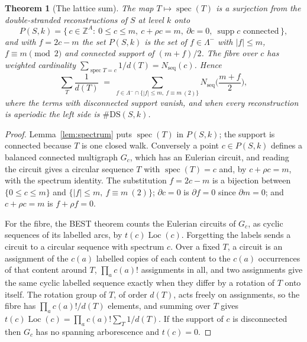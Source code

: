 \documentclass[11pt]{article}
\theoremstyle{plain}
\newtheorem{theorem}{Theorem}
\theoremstyle{definition}
\theoremstyle{remark}
\newcommand{\Z}{\mathbb{Z}}
\newcommand{\spec}{\operatorname{spec}}
\newcommand{\supp}{\operatorname{supp}}
\newcommand{\Loc}{\operatorname{Loc}}
\newcommand{\Nseq}{N_{\mathrm{seq}}}
\newcommand{\DS}{\mathrm{DS}}
\newcommand{\Lm}{\Lambda^{-}}
\begin{document}
\begin{theorem}[The lattice sum]\label{thm:lattice}
The map $T\mapsto\spec(T)$ is a surjection from the double-stranded reconstructions of $S$ at
level $k$ onto
\[
  P(S,k)=\{\,c\in\Z^A:\ 0\le c\le m,\ c+\rho c=m,\ \partial c=0,\ \supp c \text{ connected}\,\},
\]
and with $f=2c-m$ the set $P(S,k)$ is the set of $f\in\Lm$ with $|f|\le m$, $f\equiv m
\pmod 2$ and connected support of $(m+f)/2$. The fibre over $c$ has weighted cardinality
$\sum_{\spec T=c}1/d(T)=\Nseq(c)$. Hence
\[
  \sum_{T}\frac1{d(T)}\;=\;\sum_{f\in\Lm\cap\{|f|\le m,\ f\equiv m\ (2)\}}
  \Nseq\!\Big(\frac{m+f}{2}\Big),
\]
where the terms with disconnected support vanish, and when every reconstruction is aperiodic
the left side is $\#\DS(S,k)$.
\end{theorem}

\begin{proof}
Lemma~\ref{lem:spectrum} puts $\spec(T)$ in $P(S,k)$; the support is connected because $T$ is
one closed walk. Conversely a point $c\in P(S,k)$ defines a balanced connected multigraph
$G_c$, which has an Eulerian circuit, and reading the circuit gives a circular sequence $T$
with $\spec(T)=c$ and, by $c+\rho c=m$, with the spectrum identity. The substitution $f=2c-m$
is a bijection between $\{0\le c\le m\}$ and $\{|f|\le m,\ f\equiv m\ (2)\}$; $\partial c=0$
is $\partial f=0$ since $\partial m=0$; and $c+\rho c=m$ is $f+\rho f=0$.

For the fibre, the BEST theorem \cite{AEdB,SmithTutte} counts the Eulerian circuits of
$G_c$, as cyclic sequences of its labelled arcs, by $t(c)\Loc(c)$. Forgetting the labels
sends a circuit to a circular sequence with spectrum $c$. Over a fixed $T$, a circuit is an
assignment of the $c(a)$ labelled copies of each content to the $c(a)$ occurrences of that
content around $T$, $\prod_a c(a)!$ assignments in all, and two assignments give the same
cyclic labelled sequence exactly when they differ by a rotation of $T$ onto itself. The
rotation group of $T$, of order $d(T)$, acts freely on assignments, so the fibre has
$\prod_a c(a)!/d(T)$ elements, and summing over $T$ gives
$t(c)\Loc(c)=\prod_a c(a)!\sum_T 1/d(T)$. If the support of $c$ is disconnected then $G_c$
has no spanning arborescence and $t(c)=0$.
\end{proof}
\end{document}
